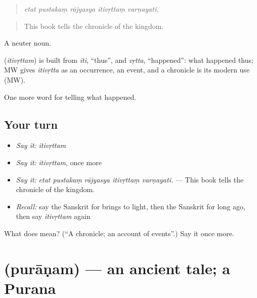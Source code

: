 \begin{quote}
\emph{etat pustakaṃ rājyasya itivṛttaṃ varṇayati.}
\end{quote}

\begin{quote}
This book tells the chronicle of the kingdom.
\end{quote}

A neuter noun.

\begin{cousinweb}
\textbf{} (\emph{itivṛttam}) is built from \emph{iti}, \textquotedblleft{}thus\textquotedblright{}, and \emph{vṛtta}, \textquotedblleft{}happened\textquotedblright{}: what happened thus; MW gives \emph{itivṛtta} as an occurrence, an event, and a chronicle is its modern use (MW).
\end{cousinweb}

\begin{grammarlens}[title={What you've built}]
One more word for telling what happened.
\end{grammarlens}

\subsection*{Your turn}
\begin{itemize}
\raggedright
  \item \emph{Say it:} \emph{itivṛttam}
  \item \emph{Say it:} \emph{itivṛttam}, once more
  \item \emph{Say it:} \emph{etat pustakaṃ rājyasya itivṛttaṃ varṇayati.} — This book tells the chronicle of the kingdom.
  \item \emph{Recall:} say the Sanskrit for brings to light, then the Sanskrit for long ago, then say \emph{itivṛttam} again
\end{itemize}

\begin{tcolorbox}[breakable,colback=teal!4,colframe=teal!35!black,title={Before you move on}]
What does  mean? (\textquotedblleft{}A chronicle; an account of events\textquotedblright{}.) Say it once more.
\end{tcolorbox}
\section[\texorpdfstring{\sk{पुराणम्} (purāṇam)}{पुराणम् (purāṇam)}]{ (purāṇam) — an ancient tale; a Purana}

